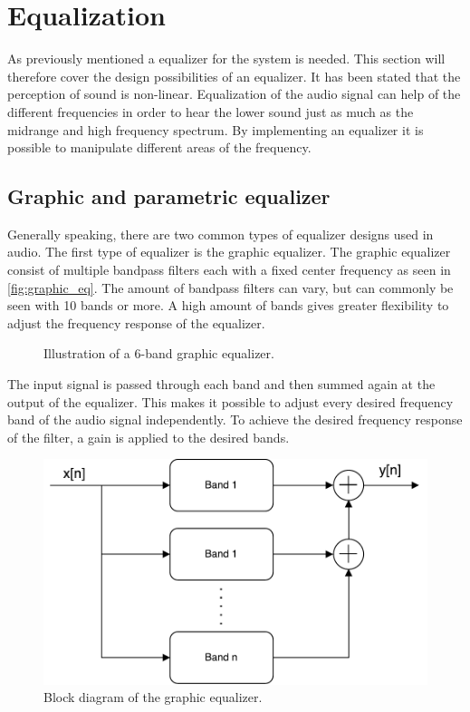 \section{Equalization}\label{sec:tech_equalizer}
As previously mentioned a equalizer for the system is needed. This section will therefore cover the design possibilities of an equalizer. It has been stated that the perception of sound is non-linear. Equalization of the audio signal can help  of the different frequencies in order to hear the lower sound just as much as the midrange and high frequency spectrum. By implementing an equalizer it is possible to manipulate different areas of the frequency.

\subsection{Graphic and parametric equalizer}

Generally speaking, there are two common types of equalizer designs used in audio. The first type of equalizer is the graphic equalizer. The graphic equalizer consist of multiple bandpass filters each with a fixed center frequency as seen in \autoref{fig:graphic_eq}. The amount of bandpass filters can vary, but can commonly be seen with 10 bands or more. A high amount of bands gives greater flexibility to adjust the frequency response of the equalizer.

\begin{figure}[H]
\centering
{}

\caption{Illustration of a 6-band graphic equalizer.}
\label{fig:graphic_eq}
\end{figure}


The input signal is passed through each band and then summed again at the output of the equalizer. This makes it possible to adjust every desired frequency band of the audio signal independently. To achieve the desired frequency response of the filter, a gain is applied to the desired bands.

\begin{figure}[H]
\centering
\includegraphics[width=0.6 \textwidth]{figures/graphic_eq_block.pdf}
\caption{Block diagram of the graphic equalizer.}
\label{fig:graphic_eq_block}
\end{figure}


